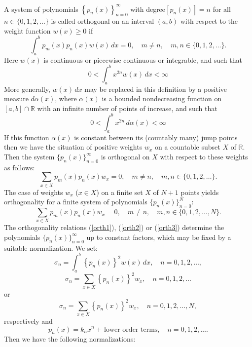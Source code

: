 \documentclass[envcountchap,graybox]{svmono}
\begin{document}
A system of polynomials $\left\{p_n(x)\right\}_{n=0}^{\infty}$ with degree$[p_n(x)]=n$ for all
$n\in\{0,1,2,\ldots\}$ is called orthogonal on an interval $(a,b)$ with respect to the weight
function $w(x)\geq 0$ if
\begin{equation}
\label{orth1}
\int_a^bp_m(x)p_n(x)w(x)\,dx=0,\quad m\neq n,\quad m,n\in\{0,1,2,\ldots\}.
\end{equation}
Here $w(x)$ is continuous or piecewise continuous or integrable, and such that
\begin{equation}
0<\int_a^bx^{2n}w(x)\,dx<\infty
\end{equation}
More generally, $w(x)\,dx$ may be replaced in this definition by a positive measure
$d\alpha(x)$, where $\alpha(x)$ is a bounded nondecreasing function on $[a,b]\cap\mathbb{R}$
with an infinite number of points of increase, and such that
\begin{equation}
0<\int_a^bx^{2n}\,d\alpha(x)<\infty
\end{equation}
If this function $\alpha(x)$ is constant between its (countably many) jump points then we have
the situation of positive weights $w_x$ on a countable subset $X$ of $\mathbb{R}$. Then the
system $\{p_n(x)\}_{n=0}^{\infty}$ is orthogonal on $X$ with respect to these weights as follows:
\begin{equation}
\label{orth2}
\sum_{x\in X}p_m(x)p_n(x)w_x=0,\quad m\neq n,\quad m,n\in\{0,1,2,\ldots\}.
\end{equation}
The case of weights $w_x$ ($x\in X$) on a finite set $X$ of $N+1$ points yields orthogonality
for a finite system of polynomials $\{p_n(x)\}_{n=0}^N$:
\begin{equation}
\label{orth3}
\sum_{x\in X}p_m(x)p_n(x)w_x=0,\quad m\neq n,\quad m,n\in\{0,1,2,\ldots,N\}.
\end{equation}
The orthogonality relations (\ref{orth1}), (\ref{orth2}) or (\ref{orth3}) determine the
polynomials $\{p_n(x)\}_{n=0}^{\infty}$ up to constant factors, which may be fixed by a
suitable normalization. We set:
\begin{equation}
\label{norm1}
\sigma_n=\int_a^b\left\{p_n(x)\right\}^2w(x)\,dx,\quad n=0,1,2,\ldots,
\end{equation}
\begin{equation}
\label{norm2}
\sigma_n=\sum_{x\in X}\left\{p_n(x)\right\}^2w_x,\quad n=0,1,2,\ldots
\end{equation}
or
\begin{equation}
\label{norm3}
\sigma_n=\sum_{x\in X}\left\{p_n(x)\right\}^2w_x,\quad n=0,1,2,\ldots,N,
\end{equation}
respectively and
\begin{equation}
\label{polynomial}
p_n(x)=k_nx^n+\,\textrm{lower order terms},\quad n=0,1,2,\ldots.
\end{equation}
Then we have the following normalizations:
\end{document}
